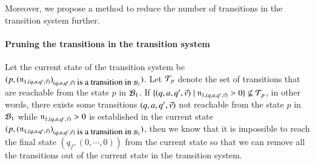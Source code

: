 Moreover, we propose a method to reduce the number of transitions in the transition system further. 

\paragraph*{Pruning the transitions in the transition system}
Let the current state of the transition system be $(p, (\mathfrak{n}_{1, (q, a, q', \vec{v})})_{(q, a, q', \vec{v})\mbox{ is a transition in } \mathcal{B}_1})$. 
Let $\mathcal{T}_p$ denote the set of transitions that are reachable from the state $p$ in $\mathcal{B}_1$. If $\{(q, a, q', \vec{v}) \mid \mathfrak{n}_{1, (q, a, q', \vec{v})} > 0\} \not \subseteq \mathcal{T}_p$, in other words, there exists some transitions $(q, a, q', \vec{v})$ not reachable from the state $p$ in $\mathcal{B}_1$ while $\mathfrak{n}_{1, (q, a, q', \vec{v})} > 0$ is established in the current state $(p, (\mathfrak{n}_{1, (q, a, q', \vec{v})})_{(q, a, q', \vec{v})\mbox{ is a transition in } \mathcal{B}_1})$, then we know that it is impossible to reach the final state $(q_f, (0,\cdots, 0))$ from the current state so that we can remove all the transitions out of the current state in the transition system.



